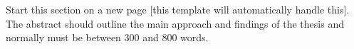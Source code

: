 

%

%




Start this section on a new page [this template will automatically handle this]. \\

\noindent
The abstract should outline the main approach and findings of the thesis and normally must be between 300 and 800 words.


%